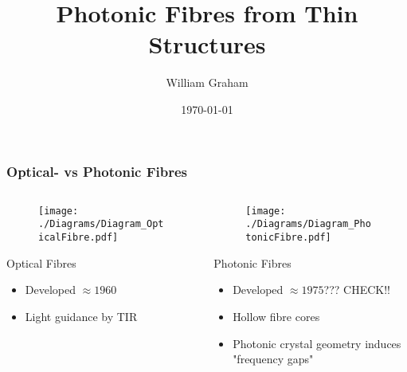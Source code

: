 \documentclass{beamer}
\title{Photonic Fibres from Thin Structures}
\author{William Graham}
\institute{University of Bath}
\date{\today}
\begin{document}
 
\frame{\titlepage}
 

\begin{frame}
	\frametitle{Optical- vs Photonic Fibres}
	
	\begin{columns}
		\begin{column}{0.475\textwidth}
			\begin{figure}
				\centering
				\texttt{[image: ./Diagrams/Diagram\_OpticalFibre.pdf]}
			\end{figure}
			\begin{block}{Optical Fibres}
				\begin{itemize}
					\item Developed $\approx 1960$
					\item Light guidance by TIR
				\end{itemize}
			\end{block}
		\end{column}
		
		\begin{column}{0.475\textwidth}
			\begin{figure}
				\centering
				\texttt{[image: ./Diagrams/Diagram\_PhotonicFibre.pdf]}
			\end{figure}
			\begin{block}{Photonic Fibres}
				\begin{itemize}
					\item Developed $\approx 1975$??? CHECK!!
					\item Hollow fibre cores
					\item Photonic crystal geometry induces "frequency gaps"
				\end{itemize}
			\end{block}
		\end{column}
	\end{columns}
\end{frame} 
\end{document}
